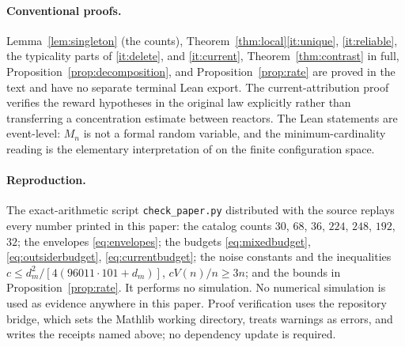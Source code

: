 \documentclass[11pt,letterpaper]{article}
\theoremstyle{plain}
\theoremstyle{definition}
\theoremstyle{remark}
\numberwithin{equation}{section}
\begin{document}
\paragraph{Conventional proofs.}
Lemma~\ref{lem:singleton} (the counts), Theorem~\ref{thm:local}\ref{it:unique}, \ref{it:reliable}, the typicality parts of \ref{it:delete}, and \ref{it:current}, Theorem~\ref{thm:contrast} in full, Proposition~\ref{prop:decomposition}, and Proposition~\ref{prop:rate} are proved in the text and have no separate terminal Lean export. The current-attribution proof verifies the reward hypotheses in the original law explicitly rather than transferring a concentration estimate between reactors. The Lean statements are event-level: $M_n$ is not a formal random variable, and the minimum-cardinality reading is the elementary interpretation of  on the finite configuration space.

\paragraph{Reproduction.}
The exact-arithmetic script \texttt{check\_paper.py} distributed with the source replays every number printed in this paper: the catalog counts $30$, $68$, $36$, $224$, $248$, $192$, $32$; the envelopes \eqref{eq:envelopes}; the budgets \eqref{eq:mixedbudget}, \eqref{eq:outsiderbudget}, \eqref{eq:currentbudget}; the noise constants and the inequalities $c\le d_m^2/[4(96011\cdot101+d_m)]$, $cV(n)/n\ge3n$; and the bounds in Proposition~\ref{prop:rate}. It performs no simulation. No numerical simulation is used as evidence anywhere in this paper. Proof verification uses the repository bridge, which sets the Mathlib working directory, treats warnings as errors, and writes the receipts named above; no dependency update is required.



\end{document}
